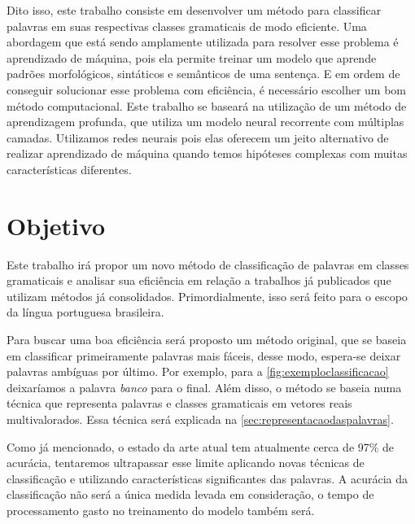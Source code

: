 Dito isso, este trabalho consiste em desenvolver um método para classificar palavras em suas respectivas classes gramaticais de modo eficiente. Uma abordagem que está sendo amplamente utilizada para resolver esse problema é aprendizado de máquina, pois ela permite treinar um modelo que aprende padrões morfológicos, sintáticos e semânticos de uma sentença. E em ordem de conseguir solucionar esse problema com eficiência, é necessário escolher um bom método computacional. Este trabalho se baseará na utilização de um método de aprendizagem profunda, que utiliza um modelo neural recorrente com múltiplas camadas. Utilizamos redes neurais pois elas oferecem um jeito alternativo de realizar aprendizado de máquina quando temos hipóteses complexas com muitas características diferentes. 


\section{Objetivo}\label{sec:objetivo}

Este trabalho irá propor um novo método de classificação de palavras em classes gramaticais e analisar sua eficiência em relação a trabalhos já publicados que utilizam métodos já consolidados. Primordialmente, isso será feito para o escopo da língua portuguesa brasileira. 

Para buscar uma boa eficiência será proposto um método original, que se baseia em classificar primeiramente palavras mais fáceis, desse modo, espera-se deixar palavras ambíguas por último. Por exemplo, para a \autoref{fig:exemploclassificacao} deixaríamos a palavra \textit{banco} para o final. Além disso, o método se baseia numa técnica que  representa palavras e classes gramaticais em vetores reais multivalorados. Essa técnica será explicada na \autoref{sec:representacaodaspalavras}. 

Como já mencionado, o estado da arte atual tem atualmente cerca de 97\% de acurácia, tentaremos ultrapassar esse limite aplicando novas técnicas de classificação e utilizando características significantes das palavras. A acurácia da classificação não será a única medida levada em consideração, o tempo de processamento gasto no treinamento do modelo também será.


